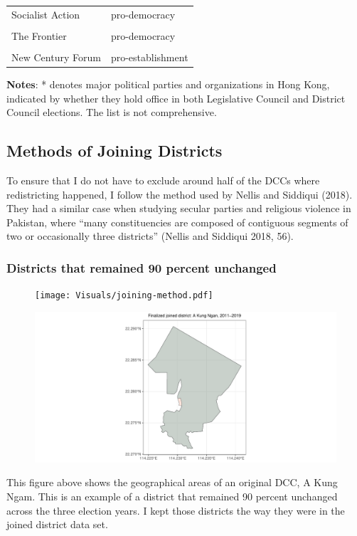 \documentclass[letterpaper, 12pt]{article}
\begin{document}
\begin{appendices}
\begin{longtable}[c]{ll}
Socialist Action & pro-democracy\\
\cellcolor{gray!6}{IOU} & \cellcolor{gray!6}{neutral/unknown}\\
The Frontier & pro-democracy\\
\cellcolor{gray!6}{Kowloon East Community} & \cellcolor{gray!6}{pro-democracy}\\
New Century Forum & pro-establishment\\
\bottomrule
\end{longtable}
{\raggedright \textbf{Notes}: * denotes major political parties and organizations in Hong Kong, indicated by whether they hold office in both Legislative Council and District Council elections. The list is not comprehensive. \par}
\endgroup{}







\pagebreak
\subsection{Methods of Joining Districts} \label{appendix:joining_methods}
To ensure that I do not have to exclude around half of the DCCs where redistricting happened, I follow the method used by Nellis and Siddiqui (2018). They had a similar case when studying secular parties and religious violence in Pakistan, where ``many constituencies are composed of contiguous segments of two or occasionally three districts'' (Nellis and Siddiqui 2018, 56).

\subsubsection*{Districts that remained 90 percent unchanged}

\begin{figure}[!h]
    \centering
    \texttt{[image: Visuals/joining-method.pdf]}
    \label{fig:akungngam}
\end{figure}
\begin{figure}[!h]
    \centering
    \includegraphics[scale=0.5]{Visuals/joining-district-unchanged.pdf}
        \label{fig: akungngam_joined}
\end{figure}
This figure above shows the geographical areas of an original DCC, A Kung Ngam. This is an example of a district that remained 90 percent unchanged across the three election years. I kept those districts the way they were in the joined district data set.




\end{appendices}
\end{document}

